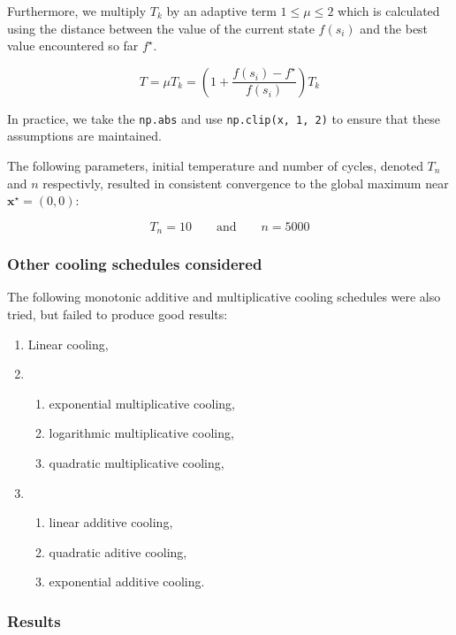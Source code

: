 \documentclass[11pt,oneside]{article}
\newcommand{\vect}[1]{\boldsymbol{#1}}
\begin{document}
Furthermore, we multiply $T_k$ by an adaptive term $1 \leq \mu \leq 2$ which
is calculated using the distance between the value of the current state $f(s_i)$ and
the best value encountered so far $f^\star$.

\begin{equation}
    T = \mu T_k =
    \left( 1 + \frac{f(s_i)-f^\star}{f(s_i)}\right)T_k
\end{equation}

In practice, we take the \texttt{np.abs} and use \texttt{np.clip(x, 1, 2)}
to ensure that these assumptions are maintained.

The following parameters, initial temperature and number of cycles, denoted 
$T_n$ and $n$ respectivly, resulted in consistent convergence to the global maximum
near $\vect{x}^\star=(0,0)$:

$$
T_n = 10\quad\quad\text{and}\quad\quad n = 5000
$$

\subsubsection{Other cooling schedules considered}

 The following monotonic additive and multiplicative
cooling schedules were also tried, but failed to produce good results:

\begin{enumerate}
    \item Linear cooling,
    \item 
    \begin{enumerate}
        \item exponential multiplicative cooling,
        \item logarithmic multiplicative cooling,
        \item quadratic multiplicative cooling,
    \end{enumerate}
    \item
        \begin{enumerate}
            \item linear additive cooling,
            \item quadratic aditive cooling,
            \item exponential additive cooling.
        \end{enumerate}
\end{enumerate}

\newpage

\subsubsection{Results}
\end{document}
